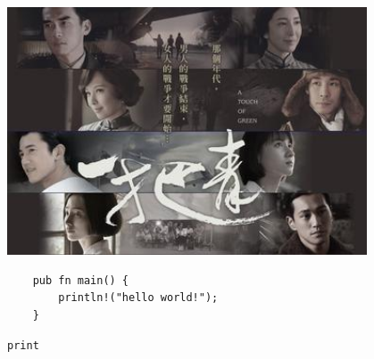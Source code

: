\documentclass[a4paper,11pt,twoside,UTF8,fontset=none]{ctexart}
\begin{document}
\setlength{\headheight}{14pt}
\begin{titlepage}
    \centering
    {\Huge \bfseries \mytitle\par}
    \vspace{1cm}

    \includegraphics[width=0.8\textwidth]{cover.jpg}\par
    \vspace{1cm}

    {\Large \myauthor\par}
    \vspace{0.5cm}

    {\Large \mydate\par}
    \vspace{2cm}

\end{titlepage}

\onecolumn

\pagestyle{empty}

\cleardoublepage

\tableofcontents

\cleardoublepage



\cleardoublepage

\twocolumn

\pagestyle{fancy}







\begin{verbatim}
    pub fn main() {
        println!("hello world!");
    }
\end{verbatim}

\texttt{print}
\end{document}

